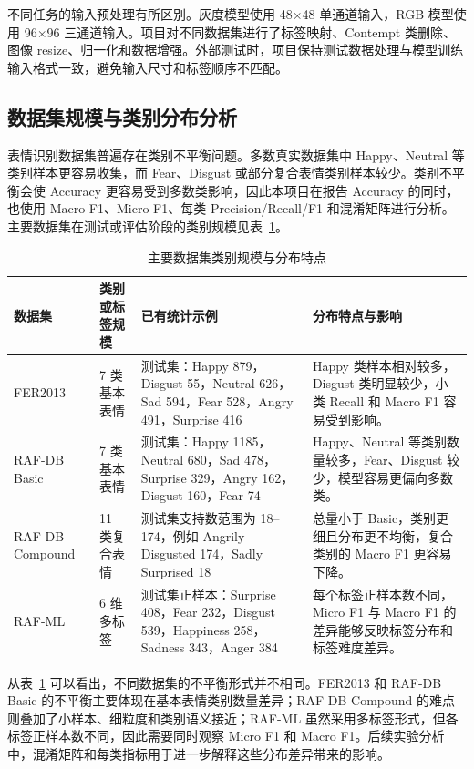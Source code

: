 \documentclass[UTF8,a4paper,12pt]{ctexart}
\begin{document}
不同任务的输入预处理有所区别。灰度模型使用 48$\times$48 单通道输入，RGB 模型使用 96$\times$96 三通道输入。项目对不同数据集进行了标签映射、Contempt 类删除、图像 resize、归一化和数据增强。外部测试时，项目保持测试数据处理与模型训练输入格式一致，避免输入尺寸和标签顺序不匹配。

\subsection{数据集规模与类别分布分析}

表情识别数据集普遍存在类别不平衡问题。多数真实数据集中 Happy、Neutral 等类别样本更容易收集，而 Fear、Disgust 或部分复合表情类别样本较少。类别不平衡会使 Accuracy 更容易受到多数类影响，因此本项目在报告 Accuracy 的同时，也使用 Macro F1、Micro F1、每类 Precision/Recall/F1 和混淆矩阵进行分析。主要数据集在测试或评估阶段的类别规模见表~\ref{tab:dataset_distribution}。

\begin{table}[H]
  \centering
  \caption{主要数据集类别规模与分布特点}
  \label{tab:dataset_distribution}
  \scriptsize
  \setlength{\tabcolsep}{3pt}
  \renewcommand{\arraystretch}{1.15}
  \begin{tabularx}{\textwidth}{p{}p{}p{}X}
    \toprule
    数据集 & 类别或标签规模 & 已有统计示例 & 分布特点与影响 \\
    \midrule
    FER2013 & 7 类基本表情 & 测试集：Happy 879，Disgust 55，Neutral 626，Sad 594，Fear 528，Angry 491，Surprise 416 & Happy 类样本相对较多，Disgust 类明显较少，小类 Recall 和 Macro F1 容易受到影响。\\
    RAF-DB Basic & 7 类基本表情 & 测试集：Happy 1185，Neutral 680，Sad 478，Surprise 329，Angry 162，Disgust 160，Fear 74 & Happy、Neutral 等类别数量较多，Fear、Disgust 较少，模型容易更偏向多数类。\\
    RAF-DB Compound & 11 类复合表情 & 测试集支持数范围为 18--174，例如 Angrily Disgusted 174，Sadly Surprised 18 & 总量小于 Basic，类别更细且分布更不均衡，复合类别的 Macro F1 更容易下降。\\
    RAF-ML & 6 维多标签 & 测试集正样本：Surprise 408，Fear 232，Disgust 539，Happiness 258，Sadness 343，Anger 384 & 每个标签正样本数不同，Micro F1 与 Macro F1 的差异能够反映标签分布和标签难度差异。\\
    \bottomrule
  \end{tabularx}
\end{table}

从表~\ref{tab:dataset_distribution} 可以看出，不同数据集的不平衡形式并不相同。FER2013 和 RAF-DB Basic 的不平衡主要体现在基本表情类别数量差异；RAF-DB Compound 的难点则叠加了小样本、细粒度和类别语义接近；RAF-ML 虽然采用多标签形式，但各标签正样本数不同，因此需要同时观察 Micro F1 和 Macro F1。后续实验分析中，混淆矩阵和每类指标用于进一步解释这些分布差异带来的影响。
\end{document}
